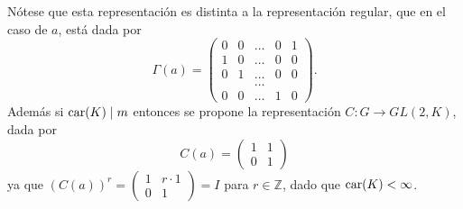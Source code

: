 \begin{ejemplo}
Nótese que esta representación es distinta a la representación regular, que en \nopagebreak[0] el caso de $a$, está dada por 
\begin{equation*} \Gamma(a) = \begin{pmatrix}
0 & 0 & \dots & 0 & 1 \\
1 & 0 & \dots & 0 & 0\\
0 & 1 & \dots & 0 & 0\\
 &  &  \dots &  &  \\
 0 & 0 & \dots & 1 & 0
\end{pmatrix}. \end{equation*}
Además si $\operatorname{car}(K) \mid m$ entonces se propone la representación $C \colon G \to GL(2,K)$, dada por
\begin{equation*}
C(a) = \begin{pmatrix}
1 & 1\\
0 & 1
\end{pmatrix} 
\end{equation*}
 ya que $(C(a))^r = \begin{pmatrix}
1 & r\cdot 1\\
0 & 1
\end{pmatrix} = I$ para $r \in \mathds{Z}$, dado que $\operatorname{car}(K) < \infty $.
\end{ejemplo} 
